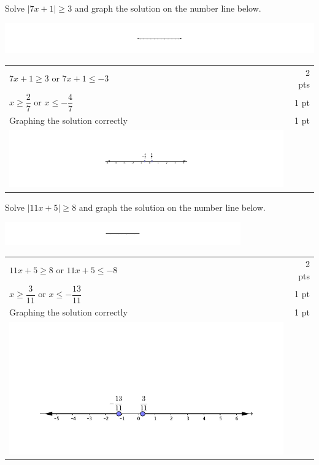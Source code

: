 {
      Solve $| 7x+1 | \geq 3$ and graph the solution on the number line below.
      
\includegraphics[width=6in]{NumberLine_19_5.pdf}
}
{


	\begin{tabular}{l r}
	$7x+1 \geq 3$ or $7x+1 \leq -3$ & 2 pts\\
	$x\geq \dfrac{2}{7}$ or $x\leq -\dfrac{4}{7}$ & 1 pt\\
	Graphing the solution correctly& 1 pt\\
	\includegraphics[width=5in]{NumberLine_19_5a.pdf}
	
	\end{tabular}
	

}

{
      Solve $| 11x+5 | \geq 8$ and graph the solution on the number line below.
      
 \includegraphics[width=4in]{NumberLine_19_5.pdf}
}
{

	\begin{tabular}{l r}
	$11x+5 \geq 8$ or $11x+5 \leq -8$ & 2 pts\\
	$x\geq \dfrac{3}{11}$ or $x\leq -\dfrac{13}{11}$ & 1 pt\\
	Graphing the solution correctly& 1 pt \\
	\includegraphics[width=5in]{NumberLine_19_5b.pdf}
	\end{tabular}
	

}

